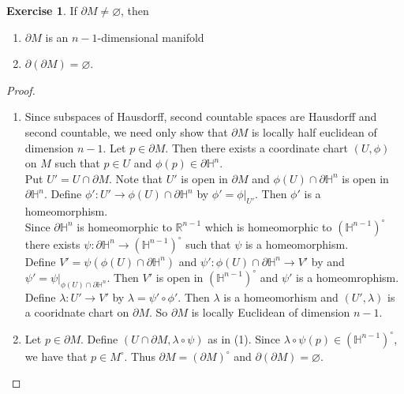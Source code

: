 \documentclass[12pt]{amsart}
\theoremstyle{definition}
\theoremstyle{definition}
\newtheorem{ex}[definition]{Exercise}
\newcommand{\lam}{\lambda}
\renewcommand{\H}{\mathbb{H}}
\newcommand{\R}{\mathbb{R}}
\begin{document}
	\begin{ex}
		If $\partial M \neq \varnothing$, then 
		\begin{enumerate}
			\item $\partial M$ is an $n-1$-dimensional manifold \item $\partial (\partial M) = \varnothing$.
		\end{enumerate}
	\end{ex}

	\begin{proof}
		\begin{enumerate}
			\item Since subspaces of Hausdorff, second countable spaces are Hausdorff and second countable, we need only show that $\partial M$ is locally half euclidean of dimension $n-1$. Let $p \in \partial M$. Then there exists a coordinate chart $(U, \phi)$ on $M$ such that $p \in U$ and $\phi(p) \in \partial \H^n$. \\
			Put $U' = U \cap \partial M$. Note that $U'$ is open in $\partial M$ and $ \phi(U) \cap \partial \H^n$ is open in $\partial \H^n$. Define  $\phi': U' \rightarrow \phi(U) \cap \partial \H^n$ by $\phi' = \phi|_{U'}$. Then $\phi'$ is a homeomorphism. \\
			Since $\partial \H^n$ is homeomorphic to $\R^{n-1}$ which is homeomorphic to $(\H^{n-1})^{\circ}$ there exists $\psi: \partial \H^n \rightarrow (\H^{n-1})^{\circ}$ such that $\psi$ is a homeomorphism.\\ 
			Define $V' = \psi(\phi(U) \cap \partial \H^n)$ and $\psi': \phi(U) \cap \partial \H^n \rightarrow V' $ by and $\psi' = \psi|_{\phi(U) \cap \partial \H^n}$. Then $V'$ is open in $(\H^{n-1})^{\circ}$ and $\psi'$ is a homeomrophism. \\ 
			Define $\lam : U' \rightarrow V'$ by $\lam = \psi' \circ \phi'$. Then $\lam$ is a homeomorhism and $(U', \lam) $ is a cooridnate chart on $\partial M$. So $\partial M$ is locally Euclidean of dimension $n-1$.  
			\item Let $p \in \partial M$. Define $(U \cap \partial M, \lam \circ \psi)$ as in (1). Since $\lam \circ \psi(p) \in (\H^{n-1})^{\circ}$, we have that $p \in M^{\circ}$. Thus $ \partial M = (\partial M)^{\circ}$ and $\partial (\partial M) = \varnothing$.
		\end{enumerate}
	\end{proof}
\end{document}
